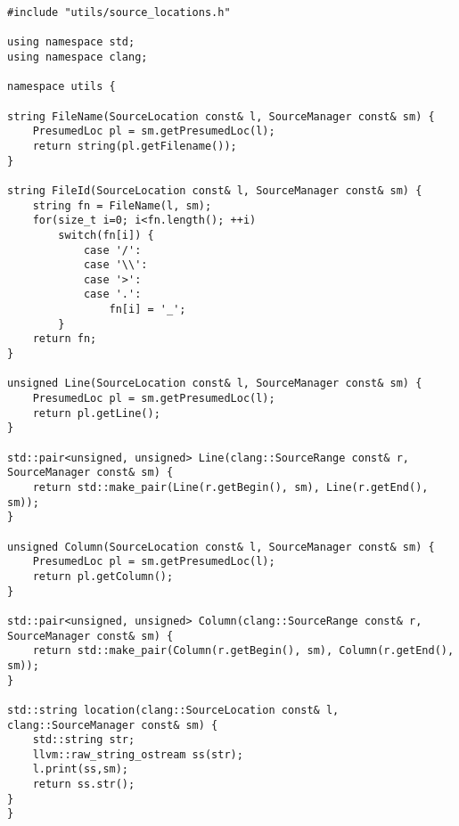 \documentclass[a4paper,11pt,twoside]{book}
\begin{document}
\begin{lstlisting}[language=CCC, caption=utilis/source\_locations.cpp]
#include "utils/source_locations.h"

using namespace std;
using namespace clang;

namespace utils {

string FileName(SourceLocation const& l, SourceManager const& sm) {
	PresumedLoc pl = sm.getPresumedLoc(l);
	return string(pl.getFilename());
}

string FileId(SourceLocation const& l, SourceManager const& sm) {
	string fn = FileName(l, sm);
	for(size_t i=0; i<fn.length(); ++i)
		switch(fn[i]) {
			case '/':
			case '\\':
			case '>':
			case '.':
				fn[i] = '_';
		}
	return fn;
}

unsigned Line(SourceLocation const& l, SourceManager const& sm) {
	PresumedLoc pl = sm.getPresumedLoc(l);
	return pl.getLine();
}

std::pair<unsigned, unsigned> Line(clang::SourceRange const& r, SourceManager const& sm) {
	return std::make_pair(Line(r.getBegin(), sm), Line(r.getEnd(), sm));
}

unsigned Column(SourceLocation const& l, SourceManager const& sm) {
	PresumedLoc pl = sm.getPresumedLoc(l);
	return pl.getColumn();
}

std::pair<unsigned, unsigned> Column(clang::SourceRange const& r, SourceManager const& sm) {
	return std::make_pair(Column(r.getBegin(), sm), Column(r.getEnd(), sm));
}

std::string location(clang::SourceLocation const& l, clang::SourceManager const& sm) {
	std::string str;
	llvm::raw_string_ostream ss(str);
	l.print(ss,sm);
	return ss.str();
}
}
\end{lstlisting}
\end{document}
